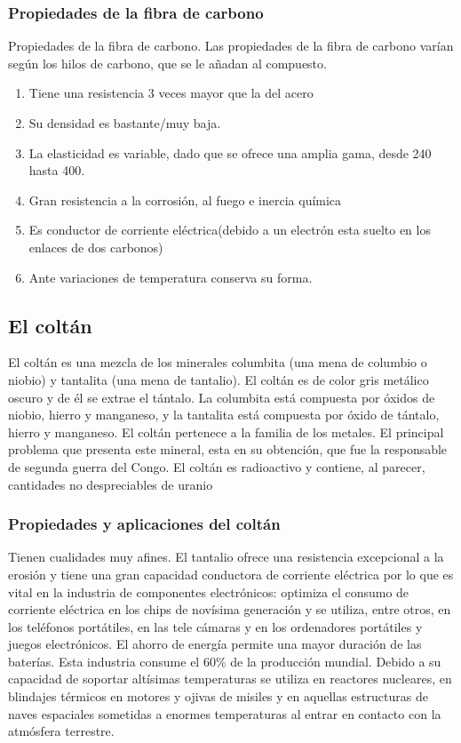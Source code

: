\documentclass[../main]{subfiles}
\begin{document}
\subsubsection{Propiedades de la fibra de carbono}
Propiedades de la fibra de carbono.
Las propiedades de la fibra de carbono varían según los hilos de
carbono, que se le añadan al compuesto.
\begin{enumerate}

  \item Tiene una resistencia 3 veces mayor que la del acero
  \item Su densidad es bastante/muy baja.
  \item  La elasticidad es variable, dado que se ofrece una amplia
    gama, desde 240 hasta 400.
  \item Gran resistencia a la corrosión, al fuego e inercia química
  \item Es conductor de corriente eléctrica(debido a un electrón esta
    suelto en los enlaces de dos carbonos)
  \item Ante variaciones de temperatura conserva su forma.
\end{enumerate}

\subsection{El coltán}

El coltán es una mezcla de los minerales columbita (una mena de
columbio o niobio) y tantalita (una mena de tantalio). El coltán es
de color gris metálico oscuro y de él se extrae el tántalo.
La columbita está compuesta por óxidos de niobio, hierro y manganeso,
y la tantalita está compuesta por óxido de tántalo, hierro y
manganeso. El coltán pertenece a la familia de los metales.
El principal problema que presenta este mineral, esta en su
obtención, que fue la responsable de segunda guerra del Congo.
El coltán es radioactivo y contiene, al parecer, cantidades no
despreciables de uranio

\subsubsection{Propiedades y aplicaciones del coltán}
Tienen cualidades muy afines. El tantalio ofrece una resistencia
excepcional a la erosión y tiene una gran capacidad conductora de
corriente eléctrica por lo que es vital en la industria de
componentes electrónicos: optimiza el consumo de corriente eléctrica
en los chips de novísima generación y se utiliza, entre otros, en los
teléfonos portátiles, en las tele cámaras y en los ordenadores
portátiles y juegos electrónicos. El ahorro de energía permite una
mayor duración de las baterías. Esta industria consume el 60\% de la
producción mundial. Debido a su capacidad de soportar altísimas
temperaturas se utiliza en reactores nucleares, en blindajes térmicos
en motores y ojivas de misiles y en aquellas estructuras de naves
espaciales sometidas a enormes temperaturas al entrar en contacto con
la atmósfera terrestre.
\end{document}
